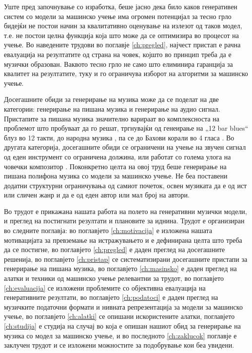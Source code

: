 Уште пред започнување со изработка, беше јасно дека било каков генеративен систем со модели за машинско учење има огромен потенцијал за тесно грло бидејќи не постои начин за квалитативно оценување на излезот од таков модел, т.е. не постои целна функција која што може да се оптимизира во процесот на учење. Во наведените трудови во поглавје \ref{ch:pregled}, најчест пристап е рачна евалуација на резултатите од страна на човек, којшто во принцип треба да е музички образован. Ваквото тесно грло не само што елиминира гаранција за квалитет на резултатите, туку и го ограничува изборот на алгоритми за машинско учење. 

Досегашните обиди за генерирање на музика може да се поделат на две категории: генерирање на пишана музика и генерирање на аудио сигнал. Пристапите за пишана музика значително варираат во комплексноста на проблемот што пробуваат да го решат, тргнувајќи од генеирање на „12 bar blues“ \cite{Eck2002} блуз во 12 такти, до народна музика \cite{Sturm2016}, па се до Бахови корали во 4 гласа \cite{Liang2017,Hadjeres2016}. Во другата категорија, досегашните обиди \cite{Oord2016} се ограничени на учење на звучен сигнал од еден инструмент со ограничена должина, или работат со голема улога на човечки композитор \cite{Ghedini2015}. Поконкретно целта на овој труд беше генерирање на пишана полифона музика со модели за машинско учење. Не беа поставени додатни структурни ограничувања од самиот почеток, освен музиката да е од ист или сличен жанр и да е од еден автор или мал број на автори.

Во трудот е прикажана нашата работа на полето на генеративни музички модели, и преглед на постигнати резултати и плановите за иднина. Трудот е организиран во следните поглавја: во поглавјето \ref{ch:motivacija} е изложена нашата мотивацијата за превземање на истражувањето и е дефинирана целта што треба да се постигне, во поглавјето \ref{ch:pregled} е даден преглед на досегашните решенија, во поглавјето \ref{ch:pristap} се систематизирани досегашните пристапи за генерирање на пишана музика, во поглавјето \ref{ch:masinsko} е даден преглед на алатки и техники од машинско учење релевантни за трудот, во поглавјето \ref{ch:evaluacija} се изложени проблемите со објективна евалуација на генеративните резултати, во поглавјето \ref{ch:podatoci} е даден преглед на музичките податочни формати и нивната репрезентација за модели за машинско учење, во поглавјето \ref{ch:alatki} се опишани искористените алатки, поглавјето \ref{ch:studija} е студија на случај во која е опишан нашиот обид за генерирање на музика со модел за машинско учење, и во последното \ref{ch:zaklucok} поглавје е заклучен трудот и се изложени можностите за подобрување кои беа увидени.


